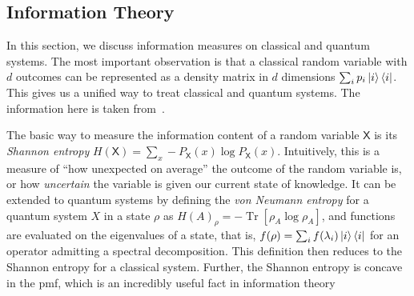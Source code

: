 \documentclass[10pt, a4paper]{article}
\numberwithin{equation}{section} %
\theoremstyle{definition}
\theoremstyle{plain}
\newcommand{\?}{\mathrel{?}} %
\newcommand{\Tr}[2][]{\mathop{\mathrm{Tr}#1}\left[ #2 \right]} %
\newcommand{\crv}[1]{\mathsf{#1}}
\begin{document}
\begin{appendices}
                    \subsection{Information Theory}\label{sec:prelim_infot}

                    In this section, we discuss information measures on classical and quantum systems. The most important observation is that a classical random variable with \(d\) outcomes can be represented as a density matrix in \(d\) dimensions \(\sum_i p_i \ket{i}\bra{i}\). This gives us a unified way to treat classical and quantum systems. The information here is taken from~\cite{NielsenChuang,ElemInfo}.

                    The basic way to measure the information content of a random variable \(\crv{X}\) is its \emph{Shannon entropy} \(H(\crv{X}) = \sum_{x} - P_{\crv{X}}(x) \log P_{\crv{X}}(x)\). Intuitively, this is a measure of ``how unexpected on average'' the outcome of the random variable is, or how \emph{uncertain} the variable is given our current state of knowledge. It can be extended to quantum systems by defining the \emph{von Neumann entropy} for a quantum system \(X\) in a state \(\rho\) as \({H(A)}_{\rho} = -\Tr{\rho_{A}\log\rho_{A}}\), and functions are evaluated on the eigenvalues of a state, that is, \(f(\rho) = \sum_i f(\lambda_i) \ket{i}\bra{i}\) for an operator admitting a spectral decomposition. This definition then reduces to the Shannon entropy for a classical system. Further, the Shannon entropy is concave in the pmf, which is an incredibly useful fact in information theory


\end{appendices}
\end{document}
